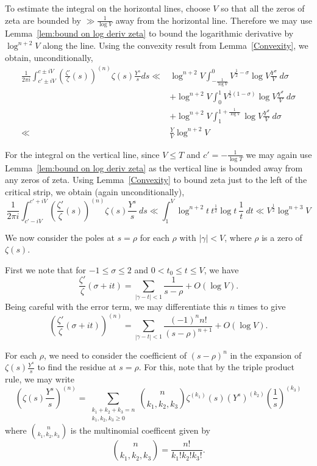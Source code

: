\documentclass[12pt,a4paper,reqno]{amsart}
\theoremstyle{remark}
\numberwithin{equation}{section}
\begin{document}
To estimate the integral on the horizontal lines, choose $V$ so that all the zeros of zeta are bounded by $\gg \frac1{\log V}$ away from the horizontal line. Therefore we may use Lemma~\ref{lem:bound on log deriv zeta} to bound the logarithmic derivative by $\log^{n+2} V$ along the line. Using the convexity result from Lemma~\ref{Convexity}, we obtain, unconditionally,
\begin{align*}
     \frac{1}{2 \pi i } \int_{c' \pm iV}^{c \pm iV} \left( \frac{\zeta'}{\zeta}(s) \right)^{(n)} \zeta(s) \frac{Y^s}{s} ds \ll &\log^{n+2} V \int_{-\frac{1}{\log V}}^0 V^{\frac{1}{2}-\sigma} \log V \frac{Y^{\sigma}}{V} \ d\sigma \\
     &+ \log^{n+2} V \int_0^1 V^{\frac{1}{2}(1-\sigma)} \log V \frac{Y^{\sigma}}{V} \ d\sigma \\
     &+ \log^{n+2} V \int_1^{1+\frac{1}{\log V}} \log V \frac{Y^{\sigma}}{V} \ d\sigma \\
     \ll&  \frac{Y}{V} \log^{n+2} V
\end{align*}


For the integral on the vertical line, since $V\leq T$ and $c'=-\frac{1}{\log T}$ we may again use Lemma~\ref{lem:bound on log deriv zeta} as the vertical line is bounded away from any zeros of zeta. Using Lemma~\ref{Convexity} to bound zeta just to the left of the critical strip, we obtain (again unconditionally),
\begin{equation*}
    \frac{1}{2 \pi i } \int_{c' - iV}^{c' + iV} \left( \frac{\zeta'}{\zeta}(s) \right)^{(n)} \zeta(s) \frac{Y^s}{s} \ ds  \ll \int_1^{V} \log^{n+2}t \  t^{\frac12} \log t \ \frac{1}{t} \ dt 
    \ll V^{\frac{1}{2}} \log^{n+3} V
\end{equation*}

We now consider the poles at $s=\rho$ for each $\rho$ with $|\gamma| < V$, where $\rho$ is a zero of $\zeta (s)$.

First we note that for $-1 \leq \sigma \leq 2$ and $0<t_0 \leq t \leq V$, we have
\[
\frac{\zeta '}{\zeta} (\sigma+i t) = \sum_{|\gamma - t| < 1} \frac{1}{s-\rho} + O(\log V).
\]
Being careful with the error term, we may differentiate this $n$ times to give
\begin{equation*}
    \left( \frac{\zeta '}{\zeta} (\sigma + it) \right)^{(n)} = \sum_{|\gamma - t| < 1} \frac{(-1)^n n!}{(s-\rho)^{n+1}} + O(\log V). 
\end{equation*}

For each $\rho$, we need to consider the coefficient of $(s-\rho)^n$ in the expansion of $\zeta(s) \frac{Y^s}{s}$ to find the residue at $s=\rho$. For this, note that by the triple product rule, we may write
\[
\left( \zeta(s) \frac{Y^s}{s} \right)^{(n)} = \sum_{\substack{k_1+k_2+k_3 = n \\ k_1, k_2, k_3 \geq 0}} \binom{n}{k_1, k_2, k_3} \zeta^{(k_1)} (s) (Y^s)^{(k_2)} \left( \frac{1}{s} \right)^{(k_3)}
\]
where $\binom{n}{k_1, k_2, k_3}$ is the multinomial coefficent given by
\[
\binom{n}{k_1, k_2, k_3} = \frac{n!}{k_1! k_2! k_3!}.
\]
\end{document}
